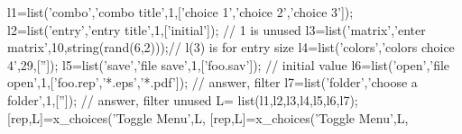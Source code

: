 \begin{examples}
  \begin{program}
    l1=list('combo','combo title',1,['choice 1','choice 2','choice 3']);
    l2=list('entry','entry title',1,['initial']); // 1 is unused 
    l3=list('matrix','enter matrix',10,string(rand(6,2)));// l(3) is for entry size
    l4=list('colors','colors choice 4',29,['']);
    l5=list('save','file save',1,['foo.sav']); // initial value 
    l6=list('open','file open',1,['foo.rep','*.eps','*.pdf']); // answer, filter 
    l7=list('folder','choose a folder',1,['']); // answer, filter unused 
    L= list(l1,l2,l3,l4,l5,l6,l7);
    [rep,L]=x_choices('Toggle Menu',L,%
    [rep,L]=x_choices('Toggle Menu',L,%
  \end{program}
\end{examples}

